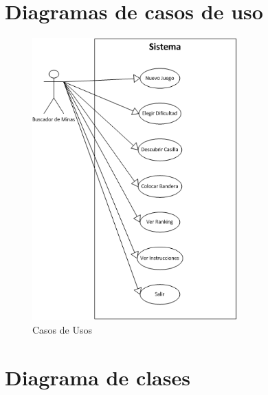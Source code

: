\documentclass[11pt]{article} %
\begin{document}
\section{\textbf{Diagramas de casos de uso }}

\begin{center}

	\begin{figure}[h!]
  		\centering
    		\includegraphics[width=0.7\textwidth]{imagenes/casosdeusos.png}
  		\caption{Casos de Usos}
		\label{fig:casosdeusos}
	\end{figure}
\end{center}

\newpage
\thispagestyle{empty}

\section{\textbf{Diagrama de clases }}
\end{document}
